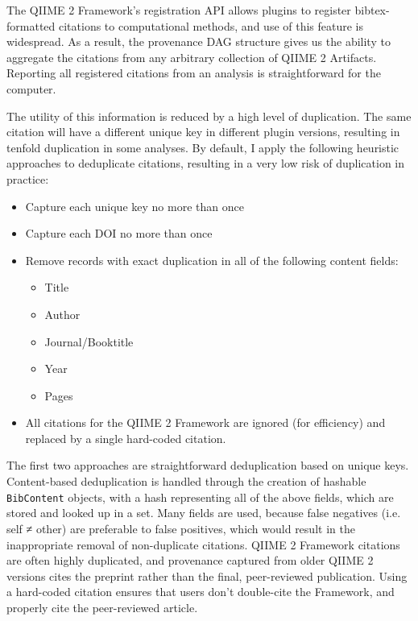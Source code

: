 The QIIME 2 Framework’s registration API allows plugins to register
bibtex-formatted citations to computational methods, and use of this feature is
widespread. As a result, the provenance DAG structure gives us the ability to
aggregate the citations from any arbitrary collection of QIIME 2 Artifacts.
Reporting all registered citations from an analysis is straightforward for the
computer.

The utility of this information is reduced by a high level of duplication. The
same citation will have a different unique key in different plugin versions,
resulting in tenfold duplication in some analyses. By default, I apply the
following heuristic approaches to deduplicate citations, resulting in a very low
risk of duplication in practice:

\begin{itemize}
\item Capture each unique key no more than once
\item Capture each DOI no more than once
\item Remove records with exact duplication in all of the following content fields:
    \begin{itemize}
    \item Title
    \item Author
    \item Journal/Booktitle
    \item Year
    \item Pages
    \end{itemize}
\item All citations for the QIIME 2 Framework are ignored (for efficiency) and replaced by a single hard-coded citation.
\end{itemize}

The first two approaches are straightforward deduplication based on unique keys.
Content-based deduplication is handled through the creation of hashable
\texttt{BibContent} objects, with a hash representing all of the above fields, which are
stored and looked up in a set. Many fields are used, because false negatives
(i.e. self ≠ other) are preferable to false positives, which would result in
the inappropriate removal of non-duplicate citations.  QIIME 2 Framework
citations are often highly duplicated, and provenance captured from older
QIIME 2 versions cites the preprint rather than the final, peer-reviewed
publication. Using a hard-coded citation ensures that users don’t double-cite
the Framework, and properly cite the peer-reviewed article.

